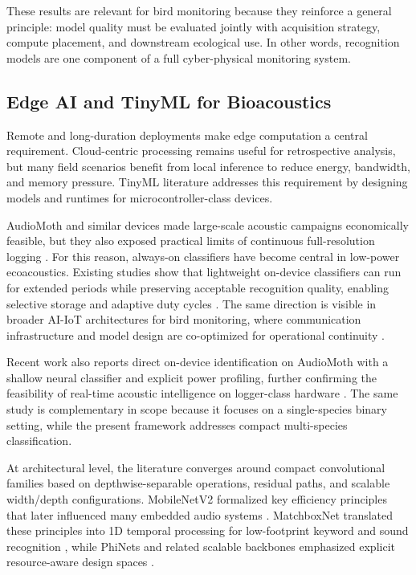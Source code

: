 \documentclass[a4paper,singleside,12pt]{report} %
\begin{document}
	These results are relevant for bird monitoring because they reinforce a general principle: model quality must be evaluated jointly with acquisition strategy, compute placement, and downstream ecological use. In other words, recognition models are one component of a full cyber-physical monitoring system.

	\subsection{Edge AI and TinyML for Bioacoustics}
	Remote and long-duration deployments make edge computation a central requirement. Cloud-centric processing remains useful for retrospective analysis, but many field scenarios benefit from local inference to reduce energy, bandwidth, and memory pressure. TinyML literature addresses this requirement by designing models and runtimes for microcontroller-class devices.

	AudioMoth and similar devices made large-scale acoustic campaigns economically feasible, but they also exposed practical limits of continuous full-resolution logging \cite{audiomoth2019}. For this reason, always-on classifiers have become central in low-power ecoacoustics. Existing studies show that lightweight on-device classifiers can run for extended periods while preserving acceptable recognition quality, enabling selective storage and adaptive duty cycles \cite{sabbella2022alwayson,tinychirp2024}. The same direction is visible in broader AI-IoT architectures for bird monitoring, where communication infrastructure and model design are co-optimized for operational continuity \cite{seguragarcia2024}.

	Recent work also reports direct on-device identification on AudioMoth with a shallow neural classifier and explicit power profiling, further confirming the feasibility of real-time acoustic intelligence on logger-class hardware \cite{velascomontero2026onsite}. The same study is complementary in scope because it focuses on a single-species binary setting, while the present framework addresses compact multi-species classification.

	At architectural level, the literature converges around compact convolutional families based on depthwise-separable operations, residual paths, and scalable width/depth configurations. MobileNetV2 formalized key efficiency principles that later influenced many embedded audio systems \cite{mobilenetv2}. MatchboxNet translated these principles into 1D temporal processing for low-footprint keyword and sound recognition \cite{matchboxnet2020}, while PhiNets and related scalable backbones emphasized explicit resource-aware design spaces \cite{phinets2022,paissan2022scalableaudio}.
\end{document}
